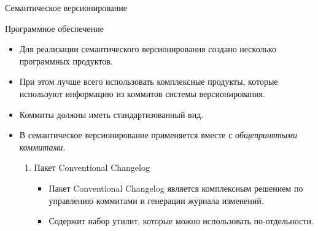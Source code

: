 \documentclass[
  ignorenonframetext,
  aspectratio=169,
  russian,
]{beamer}
\providecommand{\tightlist}{%
  \setlength{\itemsep}{0pt}\setlength{\parskip}{0pt}}
\begin{document}
\begin{frame}[fragile]{Семантическое версионирование}
\begin{block}{Программное обеспечение}
\protect{}\label{ux43fux440ux43eux433ux440ux430ux43cux43cux43dux43eux435-ux43eux431ux435ux441ux43fux435ux447ux435ux43dux438ux435}
\begin{itemize}[<+->]
\item
  Для реализации семантического версионирования создано несколько
  программных продуктов.
\item
  При этом лучше всего использовать комплексные продукты, которые
  используют информацию из коммитов системы версионирования.
\item
  Коммиты должны иметь стандартизованный вид.
\item
  В семантическое версионирование применяется вместе с
  \emph{общепринятыми коммитами}.

  \begin{enumerate}[<+->]
  \item
    Пакет Conventional Changelog

    \begin{itemize}[<+->]
    \tightlist
    \item
      Пакет Conventional Changelog является комплексным решением по
      управлению коммитами и генерации журнала изменений.
    \item
      Содержит набор утилит, которые можно использовать по-отдельности.
    \end{itemize}
  \end{enumerate}
\end{itemize}
\end{block}
\end{frame}
\end{document}

